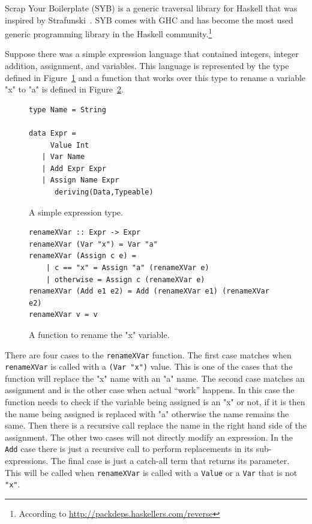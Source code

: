 	Scrap Your Boilerplate (SYB) is a generic traversal library for Haskell that was inspired by Strafunski~\citep{syb}. SYB comes with GHC and has become the most used generic programming library in the Haskell community.\footnote{According to \url{http://packdeps.haskellers.com/reverse}} 

	Suppose there was a simple expression language that contained integers, integer addition, assignment, and variables. This language is represented by the type defined in Figure~\ref{expression} and a function that works over this type to rename a variable "x" to "a" is defined in Figure~\ref{renamexvar}.
	
	\begin{figure}[t]
	\begin{lstlisting}
type Name = String

data Expr =
     Value Int
   | Var Name
   | Add Expr Expr
   | Assign Name Expr
      deriving(Data,Typeable)
	\end{lstlisting}
	\caption{A simple expression type.}
	\label{expression}
	\end{figure}
	
	\begin{figure}[t]
	\begin{lstlisting}
renameXVar :: Expr -> Expr
renameXVar (Var "x") = Var "a"
renameXVar (Assign c e) = 
	| c == "x" = Assign "a" (renameXVar e)
	| otherwise = Assign c (renameXVar e)
renameXVar (Add e1 e2) = Add (renameXVar e1) (renameXVar e2)
renameXVar v = v
	\end{lstlisting}
	\caption{A function to rename the "x" variable.}
	\label{renamexvar}
	\end{figure}
	
	There are four cases to the \texttt{renameXVar} function. The first case matches when \texttt{renameXVar} is called with a \texttt{(Var "x")} value. This is one of the cases that the function will replace the "x" name with an "a" name. The second case matches an assignment and is the other case when actual ``work'' happens. In this case the function needs to check if the variable being assigned is an "x" or not, if it is then the name being assigned is replaced with "a" otherwise the name remains the same. Then there is a recursive call replace the name in the right hand side of the assignment. The other two cases will not directly modify an expression. In the \texttt{Add} case there is just a recursive call to perform replacements in its sub-expressions. The final case is just a catch-all term that returns its parameter. This will be called when \texttt{renameXVar} is called with a \texttt{Value} or a \texttt{Var} that is not \texttt{"x"}.
	
